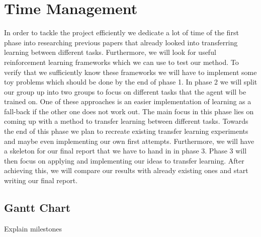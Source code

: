 \section{Time Management}
\label{sec:time}
In order to tackle the project efficiently we dedicate a lot of time of the first phase into researching previous papers that already looked into transferring learning between different tasks. Furthermore, we will look for useful reinforcement learning frameworks which we can use to test our method. To verify that we sufficiently know these frameworks we will have to implement some toy problems which should be done by the end of phase 1. 
In phase 2 we will split our group up into two groups to focus on different tasks that the agent will be trained on. One of these approaches is an easier implementation of learning as a fall-back if the other one does not work out. The main focus in this phase lies on coming up with a method to transfer learning between different tasks. Towards the end of this phase we plan to recreate existing transfer learning experiments and maybe even implementing our own first attempts. Furthermore, we will have a skeleton for our final report that we have to hand in in phase 3.
Phase 3 will then focus on applying and implementing our ideas to transfer learning. After achieving this, we will compare our results with already existing ones and start writing our final report.

\subsection{Gantt Chart}
Explain milestones